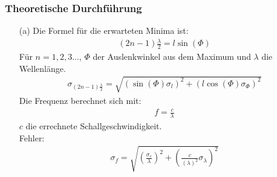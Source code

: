 \documentclass[12pt]{scrartcl}
\begin{document}
\subsubsection{Theoretische Durchführung}
\begin{enumerate}
\item[(a)]
Die Formel für die erwarteten Minima ist:
\begin{align}
(2n-1)\frac{\lambda}{2} = l \sin(\Phi)
\label{eqn:lambda_3}
\end{align}
Für $n = 1,2,3...$, $\Phi$ der Auslenkwinkel aus dem Maximum und $\lambda$ die Wellenlänge.\\
\begin{align}
\sigma_{(2n-1)\frac{\lambda}{2}} = \sqrt{
\left(\sin(\Phi)\sigma_l\right)^2+
\left(l \cos(\Phi)\sigma_{\Phi}\right)^2}
\label{eqn:lambda_3_sigma}
\end{align}
Die Frequenz berechnet sich mit:
\begin{align}
f = \frac{c}{\lambda} 
\label{eqn:freq}
\end{align}
$c$ die errechnete Schallgeschwindigkeit.\\
Fehler:
\begin{align}
\sigma_f = \sqrt{
\left(\frac{\sigma_{c}}{\lambda}\right)^2+
\left(\frac{c}{(\lambda)^2}\sigma_{\lambda}\right)^2}
\label{eqn:freq_sigma}
\end{align}
\end{enumerate}
\end{document}
